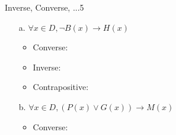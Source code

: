 \documentclass[a4paper,12pt]{book}
\newcounter{question}
\begin{document}
\begin{answersheetquestion}{5}{Inverse, Converse, ...}{5}

    \begin{enumerate}
        \item[a.] $\forall x \in D, \neg B(x) \to H(x)$
            \begin{itemize}
                \item Converse:
                    \iftoggle{answerkey}{ \begin{answer}    $\forall x \in D, H(x) \to \neg B(x)$    \end{answer} }{}  \\
                    \iftoggle{answerkey}{ \begin{answer}    For all people $x$, if $x$ is hungry, then $x$ didn't eat breakfast    \end{answer} }{} 
                
                \item Inverse:
                    \iftoggle{answerkey}{ \begin{answer}    $\forall x \in D, B(x) \to \neg H(x)$    \end{answer} }{}  \\
                    \iftoggle{answerkey}{ \begin{answer}    For all people $x$, if $x$ ate breakfast then $x$ is NOT hungry    \end{answer} }{} 
                
                \item Contrapositive:
                    \iftoggle{answerkey}{ \begin{answer}    $\forall x \in D, \neg H(x) \to B(x)$    \end{answer} }{}  \\
                    \iftoggle{answerkey}{ \begin{answer}    For all people $x$, if $x$ is NOT hungry, then $x$ ate breakfast    \end{answer} }{} 
            \end{itemize}

        \item[b.] $\forall x \in D, (P(x) \lor G(x)) \to M(x)$
            \begin{itemize}
                \item Converse:
                    \iftoggle{answerkey}{ \begin{answer}    $\forall x \in D, M(x) \to (P(x) \lor G(x))$    \end{answer} }{}  \\
                    \iftoggle{answerkey}{ \begin{answer}    For all people $x$, if $x$ is a musician, then $x$ plays piano \\
                        or $x$ plays guitar    \end{answer} }{} 
                

\end{itemize}
\end{enumerate}
\end{answersheetquestion}
\end{document}
